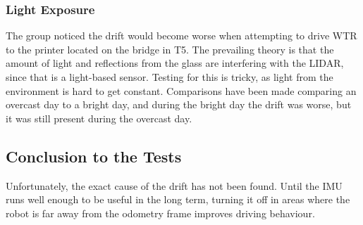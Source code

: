 \subsubsection{Light Exposure}
\label{subs::light}
The group noticed the drift would become worse when attempting to drive WTR to the printer located on the bridge in T5.
The prevailing theory is that the amount of light and reflections from the glass are interfering with the LIDAR, since that is a light-based sensor.
Testing for this is tricky, as light from the environment is hard to get constant.
Comparisons have been made comparing an overcast day to a bright day, and during the bright day the drift was worse, but it was still present during the overcast day.

\subsection{Conclusion to the Tests}
Unfortunately, the exact cause of the drift has not been found.
Until the IMU runs well enough to be useful in the long term, turning it off in areas where the robot is far away from the odometry frame improves driving behaviour.

\newpage